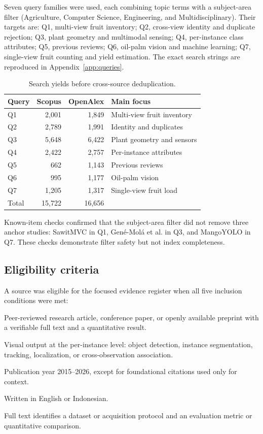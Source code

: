 Seven query families were used, each combining topic terms with a subject-area filter (Agriculture, Computer Science, Engineering, and Multidisciplinary). Their targets are: Q1, multi-view fruit inventory; Q2, cross-view identity and duplicate rejection; Q3, plant geometry and multimodal sensing; Q4, per-instance class attributes; Q5, previous reviews; Q6, oil-palm vision and machine learning; Q7, single-view fruit counting and yield estimation. The exact search strings are reproduced in Appendix~\ref{app:queries}.

\begin{table}[t]
\centering
\caption{Search yields before cross-source deduplication.}
\label{tab:searchcounts}
\small
\begin{tabular}{lrrl}
\toprule
Query & Scopus & OpenAlex & Main focus\\
\midrule
Q1 & 2{,}001 & 1{,}849 & Multi-view fruit inventory\\
Q2 & 2{,}789 & 1{,}991 & Identity and duplicates\\
Q3 & 5{,}648 & 6{,}422 & Plant geometry and sensors\\
Q4 & 2{,}422 & 2{,}757 & Per-instance attributes\\
Q5 & 662 & 1{,}143 & Previous reviews\\
Q6 & 995 & 1{,}177 & Oil-palm vision\\
Q7 & 1{,}205 & 1{,}317 & Single-view fruit load\\
\midrule
Total & 15{,}722 & 16{,}656 & \\
\bottomrule
\end{tabular}
\end{table}

Known-item checks confirmed that the subject-area filter did not remove three anchor studies: SawitMVC in Q1, Gené-Molá et al. in Q3, and MangoYOLO in Q7. These checks demonstrate filter safety but not index completeness.

\subsection{Eligibility criteria}

A source was eligible for the focused evidence register when all five inclusion conditions were met:

\begin{description}[leftmargin=*,style=nextline,itemsep=2pt]
  \item[IC1.] Peer-reviewed research article, conference paper, or openly available preprint with a verifiable full text and a quantitative result.
  \item[IC2.] Visual output at the per-instance level: object detection, instance segmentation, tracking, localization, or cross-observation association.
  \item[IC3.] Publication year 2015--2026, except for foundational citations used only for context.
  \item[IC4.] Written in English or Indonesian.
  \item[IC5.] Full text identifies a dataset or acquisition protocol and an evaluation metric or quantitative comparison.
\end{description}

